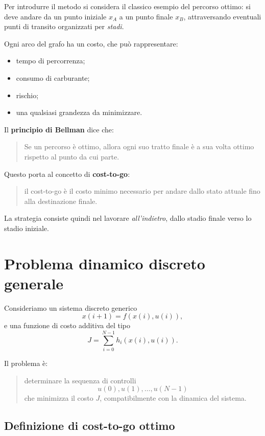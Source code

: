 Per introdurre il metodo si considera il classico esempio del percorso ottimo:
si deve andare da un punto iniziale \(x_A\) a un punto finale \(x_B\), attraversando
eventuali punti di transito organizzati per \emph{stadi}.

Ogni arco del grafo ha un costo, che può rappresentare:
\begin{itemize}
    \item tempo di percorrenza;
    \item consumo di carburante;
    \item rischio;
    \item una qualsiasi grandezza da minimizzare.
\end{itemize}

Il \textbf{principio di Bellman} dice che:

\begin{quote}
Se un percorso è ottimo, allora ogni suo tratto finale è a sua volta ottimo
rispetto al punto da cui parte.
\end{quote}

Questo porta al concetto di \textbf{cost-to-go}:

\begin{quote}
il cost-to-go è il costo minimo necessario per andare dallo stato attuale fino
alla destinazione finale.
\end{quote}

La strategia consiste quindi nel lavorare \emph{all'indietro}, dallo stadio finale
verso lo stadio iniziale.

\section{Problema dinamico discreto generale}

Consideriamo un sistema discreto generico
\[
x(i+1)=f(x(i),u(i)),
\]
e una funzione di costo additiva del tipo
\[
J=\sum_{i=0}^{N-1} h_i(x(i),u(i)).
\]

Il problema è:

\begin{quote}
determinare la sequenza di controlli
\[
u(0),u(1),\dots,u(N-1)
\]
che minimizza il costo \(J\), compatibilmente con la dinamica del sistema.
\end{quote}

\subsection{Definizione di cost-to-go ottimo}

